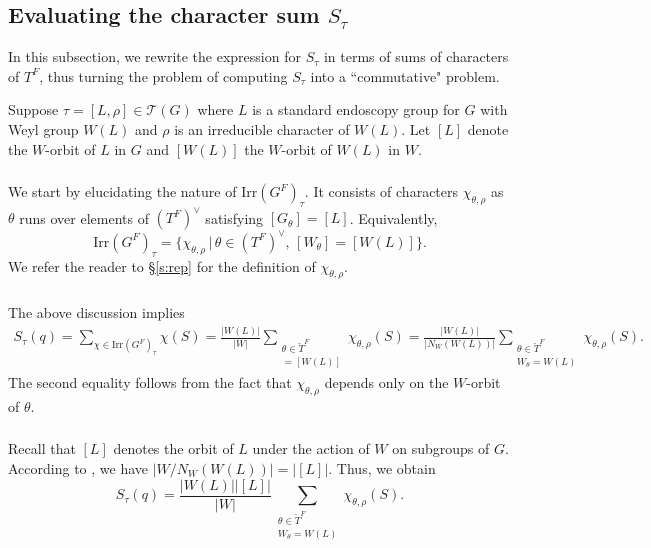 \documentclass[12pt]{amsart}
\theoremstyle{plain}
\theoremstyle{definition}
\theoremstyle{remark}
\newcommand{\cT}{\mathcal{T}}
\newcommand{\Irr}{\mathrm{Irr}}
\newcommand{\chT}{\check{T}}
\begin{document}
\subsection{Evaluating the character sum $S_\tau$}\label{s:onepunctureStau}   In this subsection, we rewrite the expression for $S_\tau$ in terms of sums of characters of $T^F$, thus turning the problem of computing $S_\tau$ into a ``commutative" problem. 

Suppose $\tau=[L,\rho]\in \cT(G)$  where $L$ is a standard endoscopy group for $G$ with Weyl group $W(L)$ and $\rho$ is an irreducible character of $W(L)$. Let $[L]$ denote the $W$-orbit of $L$ in $G$ and  $[W(L)]$ the $W$-orbit of $W(L)$ in $W$. 

\subsubsection{}\label{s:taufibre} We start by elucidating the nature of $\Irr(G^F)_\tau$. 
It  consists of characters $\chi_{\theta,\rho}$ as $\theta$ runs over elements of $(T^F)^\vee$ satisfying $[G_\theta]=[L]$. Equivalently, 
\[
\Irr(G^F)_\tau=\{\chi_{\theta, \rho}\, |\, \theta \in (T^F)^\vee, \,  [W_\theta]=[W(L)]\}. 
\]
We refer the reader to \S \ref{s:rep} for the definition of $\chi_{\theta, \rho}$. 


\subsubsection{} The above discussion implies
\begin{multline*}
S_\tau(q) = \displaystyle \sum_{\chi \in \Irr(G^F)_\tau} \chi(S) =
\frac{|W(L)|}{|W|}\sum_{\substack{\theta\in \chT^F \\ [W_\theta]=  [W(L)]}} \chi_{\theta, \rho}(S) =
\frac{|W(L)|}{|N_W(W(L))|}\sum_{\substack{\theta\in \chT^F \\ W_\theta=  W(L)}} \chi_{\theta, \rho}(S).
\end{multline*}
The second equality follows from the fact that $\chi_{\theta, \rho}$ depends only on the $W$-orbit of $\theta$.

\subsubsection{} \label{s:Carter} Recall that $[L]$ denotes the orbit of $L$ under the action of $W$ on subgroups of $G$. According to \cite[Lemma 34]{Carter72}, we have ${|W/N_W(W(L))|}=|[L]|$. Thus, we obtain 
\[
S_\tau(q) =
\frac{|W(L)||[L]|}{|W|}\sum_{\substack{\theta\in \chT^F \\ W_\theta=  W(L)}} \chi_{\theta, \rho}(S).
\]
\end{document}
